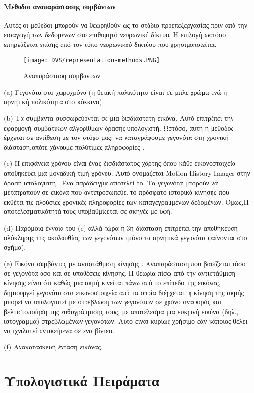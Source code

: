 \documentclass[12pt]{report}
\begin{document}
\subsubsection{Μέθοδοι αναπαράστασης συμβάντων}
Αυτές οι μέθοδοι μπορούν να θεωρηθούν ως το στάδιο προεπεξεργασίας πριν από την εισαγωγή των δεδομένων στο επιθυμητό νευρωνικό δίκτυο. Η επιλογή ωστόσο επηρεάζεται επίσης από τον τύπο νευρωνικού δικτύου που χρησιμοποιείται.
\begin{figure}[htp] %
    \centering
     \texttt{[image: DVS/representation-methods.PNG]}
    \caption{Αναπαράσταση συμβάντων}
    \label{fig:representation-methods}
\end{figure}


(\textlatin{a}) Γεγονότα στο χωροχρόνο (η θετική πολικότητα είναι σε μπλε χρώμα ενώ η αρνητική πολικότητα στο κόκκινο).

(\textlatin{b}) Τα συμβάντα συσσωρεύονται σε μια δισδιάστατη εικόνα. Αυτό επιτρέπει την εφαρμογή συμβατικών αλγορίθμων όρασης υπολογιστή. Ωστόσο, αυτή η μέθοδος έρχεται σε αντίθεση με τον στόχο μας: να καταγράφουμε γεγονότα στη χρονική διάσταση,οπότε χάνουμε πολύτιμες πληροφορίες .

(\textlatin{c}) Η επιφάνεια χρόνου είναι ένας δισδιάστατος χάρτης όπου κάθε εικονοστοιχείο αποθηκεύει μια μοναδική τιμή χρόνου. Αυτό ονομάζεται \textlatin{Motion History Images} στην όραση υπολογιστή \cite{ahad2012}. Ένα παράδειγμα αποτελεί το \cite{lagorge2017} .Τα γεγονότα μπορούν να μετατραπούν σε εικόνα που αντιπροσωπεύει το πρόσφατο ιστορικό κίνησης που εκθέτει τις πλούσιες χρονικές πληροφορίες των καταγεγραμμένων δεδομένων. Όμως,Η αποτελεσματικότητά τους υποβαθμίζεται σε σκηνές με υφή.

(\textlatin{d}) Παρόμοια έννοια του (c) αλλά τώρα η 3η διάσταση επιτρέπει την αποθήκευση ολόκληρης της ακολουθίας των γεγονότων (μόνο τα αρνητικά γεγονότα φαίνονται στο σχήμα).

(\textlatin{e}) Εικόνα συμβάντος με αντιστάθμιση κίνησης \cite{Gallego2019}. Αναπαράσταση που βασίζεται τόσο σε γεγονότα όσο και σε υποθέσεις κίνησης. Η θεωρία πίσω από την αντιστάθμιση κίνησης είναι ότι καθώς μια ακμή κινείται πάνω από το επίπεδο της εικόνας, δημιουργεί γεγονότα στα εικονοστοιχεία από τα οποία διέρχεται. η κίνηση της ακμής μπορεί να υπολογιστεί με στρέβλωση των γεγονότων σε χρόνο αναφοράς και βελτιστοποίηση της ευθυγράμμισης τους, με αποτέλεσμα μια ευκρινή εικόνα (δηλ., ιστόγραμμα) στρεβλωμένων γεγονότων. Αυτό είναι κυρίως χρήσιμο εάν κάποιος θέλει να ιχνιλατεί αντικείμενα σε ένα βίντεο.

(\textlatin{f}) Ανακατασκευή ένταση εικόνας\cite{rebecq2019}.


\chapter{Υπολογιστικά Πειράματα}


\end{document}
